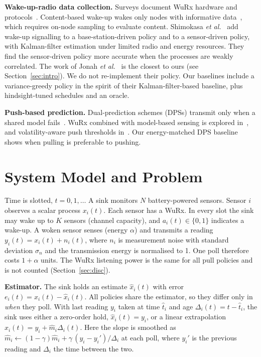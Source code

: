 \documentclass[conference]{IEEEtran}
\begin{document}
\textbf{Wake-up-radio data collection.} Surveys document WuRx hardware and
protocols~\cite{piyare2017,oller2016}. Content-based wake-up wakes only nodes
with informative data~\cite{shiraishi2023timing,shiraishi2025topk,deshpande2023},
which requires on-node sampling to evaluate content. Shimokasa
\emph{et al.}~\cite{shimokasa2025} add wake-up signalling to a
base-station-driven policy and to a sensor-driven policy, with Kalman-filter
estimation under limited radio and energy resources. They find the
sensor-driven policy more accurate when the processes are weakly correlated. The
work of Jonah \emph{et al.}~\cite{jonah2025,jonah2026fair} is the closest to
ours (see Section~\ref{sec:intro}). We do not re-implement their policy. Our baselines include a
variance-greedy policy in the spirit of their Kalman-filter-based baseline, plus
hindsight-tuned schedules and an oracle.

\textbf{Push-based prediction.} Dual-prediction schemes (DPSs) transmit only
when a shared model fails~\cite{santini2006}. WuRx combined with model-based
sensing is explored in~\cite{raza2016}, and volatility-aware push thresholds
in~\cite{kangethe2026}. Our energy-matched DPS baseline shows when pulling is
preferable to pushing.

\section{System Model and Problem}\label{sec:model}
Time is slotted, $t=0,1,\dots$ A sink monitors $N$ battery-powered sensors.
Sensor $i$ observes a scalar process $x_i(t)$. Each sensor has a WuRx. In every
slot the sink may wake up to $K$ sensors (channel capacity), and
$a_i(t)\in\{0,1\}$ indicates a wake-up. A woken sensor senses (energy $\alpha$)
and transmits a reading $y_i(t)=x_i(t)+n_i(t)$, where $n_i$ is measurement noise
with standard deviation $\sigma_n$ and the transmission energy is normalised to
1. One poll therefore costs $1+\alpha$ units. The WuRx listening power is the same
for all pull policies and is not counted (Section~\ref{sec:disc}).

\textbf{Estimator.} The sink holds an estimate $\hat x_i(t)$ with error
$e_i(t)=x_i(t)-\hat x_i(t)$. All policies share the estimator, so they differ only
in \emph{when} they poll. With last reading $y_i$ taken at time $\hat t_i$ and age
$\Delta_i(t)=t-\hat t_i$, the sink uses either a zero-order hold,
$\hat x_i(t)=y_i$, or a linear extrapolation $\hat x_i(t)=y_i+\hat m_i\Delta_i(t)$.
Here the slope is smoothed as $\hat m_i\leftarrow(1-\gamma)\hat m_i+\gamma\,(y_i-y_i')/\Delta_i$
at each poll, where $y_i'$ is the previous reading and $\Delta_i$ the time between the two.
\end{document}
